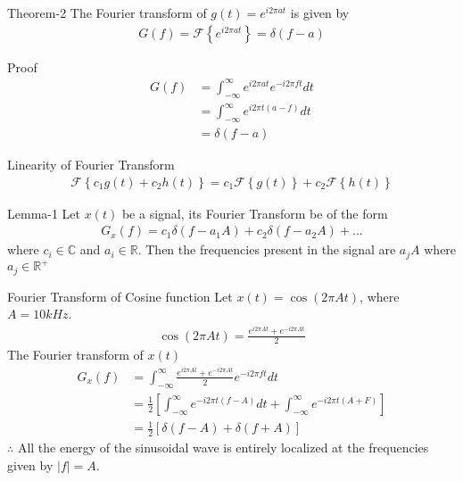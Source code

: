 \documentclass{beamer}
\providecommand{\brak}[1]{\ensuremath{\left(#1\right)}}
\providecommand{\sbrak}[1]{\ensuremath{{}\left[#1\right]}}
\providecommand{\cbrak}[1]{\ensuremath{\left\{#1\right\}}}
\begin{document}
\begin{frame}{}
    \begin{block}{Theorem-2}
     The Fourier transform of $g\brak{t}=e^{i2\pi at}$ is given by 
\begin{align}
    G\brak{f}=\mathcal{F}\cbrak{e^{i2\pi at}}=\delta\brak{f-a}
\end{align}
    \end{block}
    \begin{block}{Proof}
     \begin{align}
     G\brak{f}&=\int_{-\infty}^{\infty}e^{i2\pi at}e^{-i2\pi ft}dt\\
     &=\int_{-\infty}^{\infty}e^{i2\pi t\brak{a-f}}dt\\
     &=\delta\brak{f-a}
 \end{align}
    \end{block}
\end{frame}
\begin{frame}{}
  \begin{block}{Linearity of Fourier Transform}
   \begin{align}
    \mathcal{F}\cbrak{c_1g\brak{t}+c_2h\brak{t}}=c_1\mathcal{F}\cbrak{g\brak{t}}+c_2\mathcal{F}\cbrak{h\brak{t}}
\end{align}
  \end{block} 
  \begin{block}{Lemma-1}
   Let $x\brak{t}$ be a signal, its Fourier Transform  be of the form
\begin{align}
    G_x\brak{f}=c_1\delta\brak{f-a_1A}+c_2\delta\brak{f-a_2A}+...
\end{align}
where $c_i\in \mathbb{C}$ and $a_i\in \mathbb{R}$. 
Then the frequencies present in the signal are $a_jA $ where $a_j\in \mathbb{R}^{+}$
  \end{block}
\end{frame}
\begin{frame}{Fourier Transform of Cosine function}
    Let $x\brak{t}=\cos{\brak{2\pi At}}$, where $A=10kHz$.
\begin{align}
  \cos{\brak{2\pi At}}=\frac{e^{i2\pi At}+e^{-i2\pi At}}{2}  
\end{align}
The Fourier transform of $x\brak{t}$ 
\begin{align}
    G_x\brak{f}&=\int_{-\infty}^{\infty}\frac{e^{i2\pi At}+e^{-i2\pi At}}{2}e^{-i2\pi ft}dt\\
    &=\frac{1}{2}\sbrak{\int_{-\infty}^{\infty}e^{-i2\pi t(f-A)}dt+\int_{-\infty}^{\infty}e^{-i2\pi t(A+F)}}\\
    &=\frac{1}{2}\sbrak{\delta\brak{f-A}+\delta\brak{f+A}}
\end{align}
$\therefore$ All the energy of the sinusoidal wave is  entirely localized at the frequencies given by $|f|=A$.
\end{frame}
\end{document}
